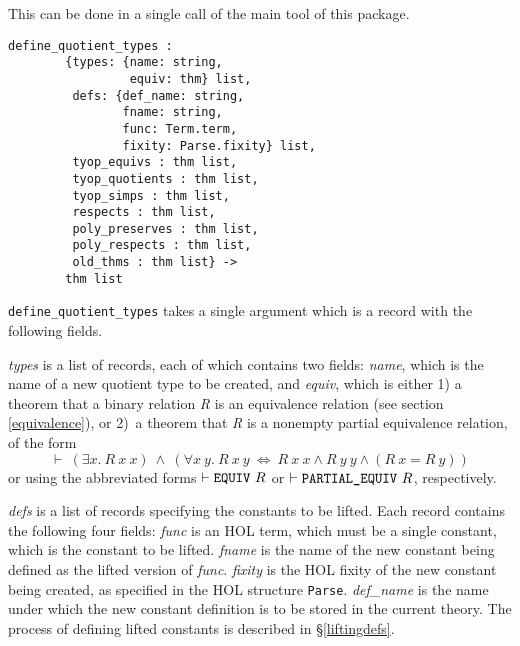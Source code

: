 \documentclass[envcountsame,runningheads]{llncs}
\begin{document}
This can be done in a single call of the
main tool of this package.

\begin{verbatim}
define_quotient_types :
        {types: {name: string,
                 equiv: thm} list,
         defs: {def_name: string,
                fname: string,
                func: Term.term,
                fixity: Parse.fixity} list,
         tyop_equivs : thm list,
         tyop_quotients : thm list,
         tyop_simps : thm list,
         respects : thm list,
         poly_preserves : thm list,
         poly_respects : thm list,
         old_thms : thm list} ->
        thm list
\end{verbatim}

{\tt define\_quotient\_types} takes a single argument which is a
record with the following fields.

{\it types\/} is a list of records, each of which contains two fields:
{\it name}, which is the name of a new quotient type to be created, and
{\it equiv}, which is
either 1)
a theorem that a binary relation {\it R\/}
is an equivalence relation
(see section \ref{equivalence}),
or 2)\ a theorem that {\it R\/} is a nonempty partial equivalence relation,
of the form
$$
\vdash\
(\exists x.\ R\ x\ x) \ \wedge \
(\forall x\ y.\ R\ x\ y \ \Leftrightarrow \
                R\ x\ x \wedge R\ y\ y \wedge (R\ x = R\ y))
$$
%
\noindent
or using the abbreviated forms
$\vdash \mbox{\tt EQUIV}\ R$
or
$\vdash \mbox{\tt PARTIAL\_EQUIV}\ R$, respectively.

{\it defs\/} is a list of records specifying the constants to be lifted.
Each record contains the following four fields:
{\it func\/} is an HOL term, which must be a single constant, which is the
constant to be lifted.
{\it fname\/} is the name of the new constant being defined as the lifted version of {\it func}.
{\it fixity\/} is the HOL fixity of the new constant being created,
as specified in the HOL structure {\tt Parse}.
{\it def\_name} is the name under which the new constant definition is to
be stored in the current theory.
The
process of defining lifted constants
is described in
\S\ref{liftingdefs}.
\end{document}
